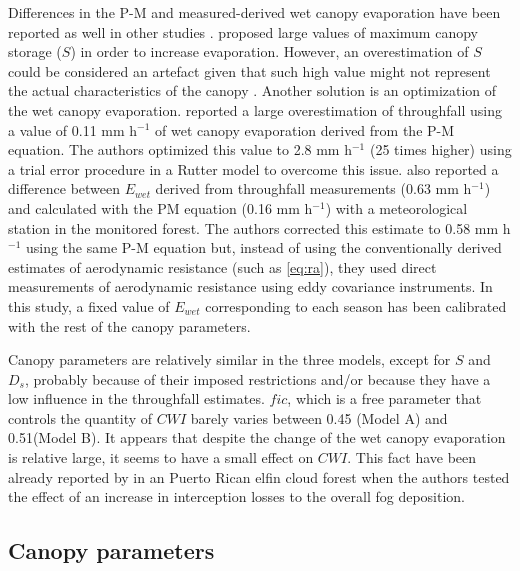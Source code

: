 \documentclass[a4paper,12pt]{article}
\begin{document}
\begin{linenumbers}
Differences in the P-M and measured-derived wet canopy evaporation have been reported as well in other studies \citep{Scatena1990, Dykes1997, Waterlooetal1999, Schellekensetal1999, WallaceandMcJannet2008, Holwerdaetal2012}. \cite{Calderetal1986} proposed large values of maximum canopy storage ($S$) in order to increase evaporation. However, an overestimation of $S$ could be considered an artefact given that such high value might not represent the actual characteristics of the canopy \citep{Lloydetal1988}. Another solution is an optimization of the wet canopy evaporation. \cite{Schellekensetal1999} reported a large overestimation of throughfall using a value of 0.11 mm h$^{-1}$ of wet canopy evaporation derived from the P-M equation. The authors optimized this value to 2.8 mm h$^{-1}$ (25 times higher) using a trial error procedure in a Rutter model to overcome this issue. \cite{Holwerdaetal2012} also reported a difference between $E_{wet}$ derived from throughfall measurements (0.63 mm h$^{-1}$) and calculated with the PM equation (0.16 mm h$^{-1}$) with a meteorological station in the monitored forest. The authors corrected this estimate to 0.58 mm h$^{-1}$ using the same P-M equation but, instead of using the conventionally derived estimates of aerodynamic resistance (such as \autoref{eq:ra}), they used direct measurements of aerodynamic resistance using eddy covariance instruments. In this study, a fixed value of $E_{wet}$ corresponding to each season has been calibrated with the rest of the canopy parameters.

Canopy parameters are relatively similar in the three models, except for $S$ and $D_s$, probably because of their imposed restrictions and/or because they have a low influence in the throughfall estimates. $fic$, which is a free parameter that controls the quantity of $CWI$ barely varies between 0.45 (Model A) and 0.51(Model B). It appears that despite the change of the wet canopy evaporation is relative large, it seems to have a small effect on $CWI$. This fact have been already reported by \cite{Holwerdaetal2006} in an Puerto Rican elfin cloud forest when the authors tested the effect of an increase in interception losses to the overall fog deposition.

\subsection{Canopy parameters} \label{dis_int_model}


\end{linenumbers}
\end{document}
